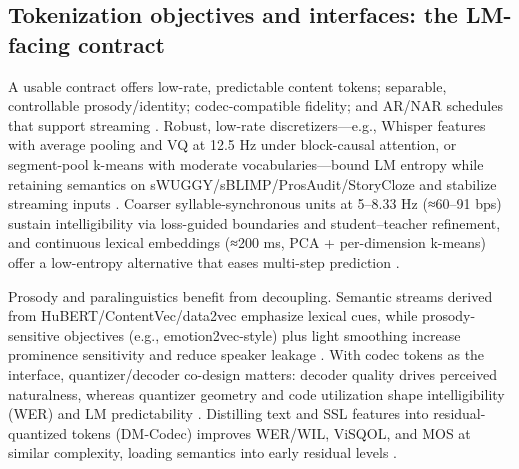\subsection{Tokenization objectives and interfaces: the LM-facing contract} \label{subsec:Tokenization objectives and interfaces: the LM-facing contract}
A usable contract offers low-rate, predictable content tokens; separable, controllable prosody/identity; codec-compatible fidelity; and AR/NAR schedules that support streaming \cite{guo2025recentadvancesdiscretespeechtokensreview}. Robust, low-rate discretizers—e.g., Whisper features with average pooling and VQ at 12.5 Hz under block-causal attention, or segment-pool k-means with moderate vocabularies—bound LM entropy while retaining semantics on sWUGGY/sBLIMP/ProsAudit/StoryCloze and stabilize streaming inputs \cite{zeng2024scalingspeechtextpretrainingsyntheticint,kando2025exploringeffectsegmentationvocabularysiz}. Coarser syllable-synchronous units at 5–8.33 Hz (≈60–91 bps) sustain intelligibility via loss-guided boundaries and student–teacher refinement, and continuous lexical embeddings (≈200 ms, PCA + per-dimension k-means) offer a low-entropy alternative that eases multi-step prediction \cite{baade2024syllablelmlearningcoarsesemanticunitsspe,algayres2023generativespokenlanguagemodelbasedcontin}.

Prosody and paralinguistics benefit from decoupling. Semantic streams derived from HuBERT/ContentVec/data2vec emphasize lexical cues, while prosody-sensitive objectives (e.g., emotion2vec-style) plus light smoothing increase prominence sensitivity and reduce speaker leakage \cite{onda2025benchmarkingprosodyencodingdiscretespeec}. With codec tokens as the interface, quantizer/decoder co-design matters: decoder quality drives perceived naturalness, whereas quantizer geometry and code utilization shape intelligibility (WER) and LM predictability \cite{li2024investigatingneuralaudiocodecsspeechlang}. Distilling text and SSL features into residual-quantized tokens (DM-Codec) improves WER/WIL, ViSQOL, and MOS at similar complexity, loading semantics into early residual levels \cite{ahasan2025dmcodecdistillingmultimodalrepresentatio}.

